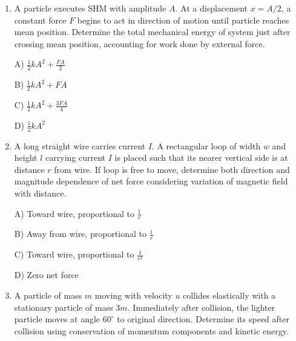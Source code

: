 \documentclass[12pt]{article}
\begin{document}
\begin{enumerate}
\begin{center}
\begin{tikzpicture}[scale=1.1]
\end{tikzpicture}
\end{center}

A) \(\sqrt{2gR}\)  

B) \(\sqrt{3gR}\)  

C) \(\sqrt{4gR}\)  

D) \(\sqrt{5gR}\)

\item A particle executes SHM with amplitude \(A\). At a displacement \(x=A/2\), a constant force \(F\) begins to act in direction of motion until particle reaches mean position. Determine the total mechanical energy of system just after crossing mean position, accounting for work done by external force.

A) \(\frac{1}{2}kA^2 + \frac{FA}{2}\)  

B) \(\frac{1}{2}kA^2 + FA\)  

C) \(\frac{1}{2}kA^2 + \frac{3FA}{4}\)  

D) \(\frac{1}{2}kA^2\)

\item A long straight wire carries current \(I\). A rectangular loop of width \(w\) and height \(l\) carrying current \(I\) is placed such that its nearer vertical side is at distance \(r\) from wire. If loop is free to move, determine both direction and magnitude dependence of net force considering variation of magnetic field with distance.

\begin{center}
\end{center}

A) Toward wire, proportional to \(\frac{1}{r}\) 

B) Away from wire, proportional to \(\frac{1}{r}\)

C) Toward wire, proportional to \(\frac{1}{r^2}\)

D) Zero net force  

\item A particle of mass \(m\) moving with velocity \(u\) collides elastically with a stationary particle of mass \(3m\). Immediately after collision, the lighter particle moves at angle \(60^\circ\) to original direction. Determine its speed after collision using conservation of momentum components and kinetic energy.


\end{enumerate}
\end{document}

